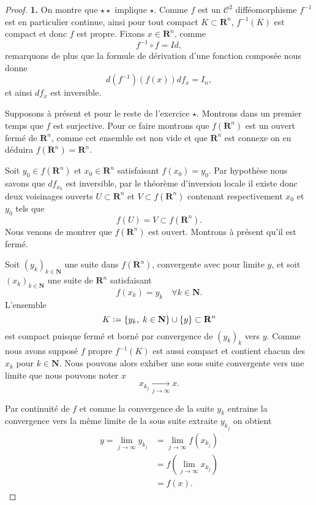\documentclass[12pt]{article}
\newcommand{\defeq}{\vcentcolon=}
\newcommand{\R}{\mathbf{R}}
\newcommand{\N}{\mathbf{N}}
\begin{document}
\begin{proof}
        \textbf{1.} On montre que $\star\star$ implique $\star$. Comme $f$ est un $\mathcal{C}^{2}$ difféomorphisme $f^{-1}$ est en particulier continue, ainsi pour tout compact $K \subset \R^{n}$, $f^{-1}(K)$ est compact et donc $f$ est propre. Fixons $x \in \R^{n}$, comme \[
                f^{-1}\circ f = Id
        ,\] remarquons de plus que la formule de dérivation d'une fonction composée nous donne \[
        d(f^{-1})(f(x)) df_{x} = I_{n}
,\] et ainsi $df_{x}$ est inversible. 

\medskip

Supposons à présent et pour le reste de l'exercice $\star$. Montrons dans un premier temps que $f$ est surjective. Pour ce faire montrons que $f(\R^{n})$ est un ouvert fermé de $\R^{n}$, comme cet ensemble est non vide et que $\R^{n}$ est connexe on en déduira $f(\R^{n}) = \R^{n}$.

Soit $y_0 \in f(\R^{n})$ et $x_0 \in \R^{n}$ satisfaisant $f(x_0) = y_0$. Par hypothèse nous savons que $df_{x_0}$ est inversible, par le théorème d'inversion locale il existe donc deux voisinages ouverts $U \subset \R^{n}$ et $V \subset f(\R^{n})$ contenant respectivement $x_0$ et $y_0$ tels que \[
        f(U) = V \subset f(\R^{n})
.\] Nous venons de montrer que $f(\R^{n})$ est ouvert. Montrons à présent qu'il est fermé.


Soit $(y_{k})_{k\in\N}$ une suite dans $f(\R^{n})$, convergente avec pour limite $y$, et soit $(x_{k})_{k\in\N}$ une suite de $\R^{n}$ satisfaisant \[
        f(x_{k}) = y_{k} \quad \forall k \in \N
.\] 
L'ensemble  \[
K \defeq \{y_{k}, \; k\in \N\} \cup \{y\} \subset \R^{n}
\] est compact puisque fermé et borné par convergence de $(y_{k})_{k}$ vers $y$. Comme nous avons supposé $f$ propre $f^{-1}(K)$  est aussi compact et contient chacun des $x_{k}$ pour $k \in \N$. Nous pouvons alors exhiber une sous suite convergente vers une limite que nous pouvons noter $x$  \[
x_{k_{j}} \underset{j\to\infty}{\longrightarrow} x
.\] 


Par continuité de $f$ et comme la convergence de la suite $y_{k}$ entraine la convergence vers la même limite de la sous suite extraite $y_{k_{j}}$ on obtient
\begin{align*}
        y = \lim_{j\to \infty}y_{k_{j}} &= \lim_{j\to \infty}f(x_{k_{j}}) \\
                                        &= f(\lim_{j\to \infty}x_{k_{j}}) \\
                                        &= f(x)
.\end{align*}


\end{proof}
\end{document}
